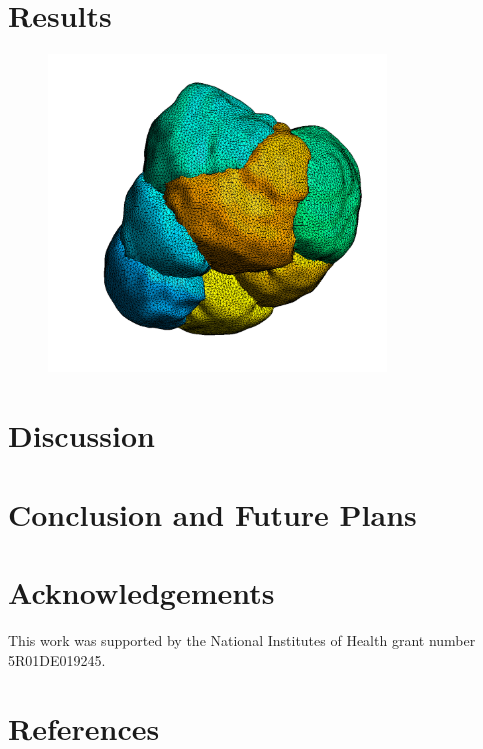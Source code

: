 \documentclass[a4paper,10pt]{article}
\begin{document}
\section{Results}
\begin{figure}[H]
\begin{center}
\includegraphics[width=0.8\textwidth]{images/seven_cells_smooth_crop.png}
\end{center}
\end{figure}

\section{Discussion}

\section{Conclusion and Future Plans}

\section{Acknowledgements}
This work was supported by the National Institutes of Health grant number 5R01DE019245.\\

\section{References}
\end{document}
